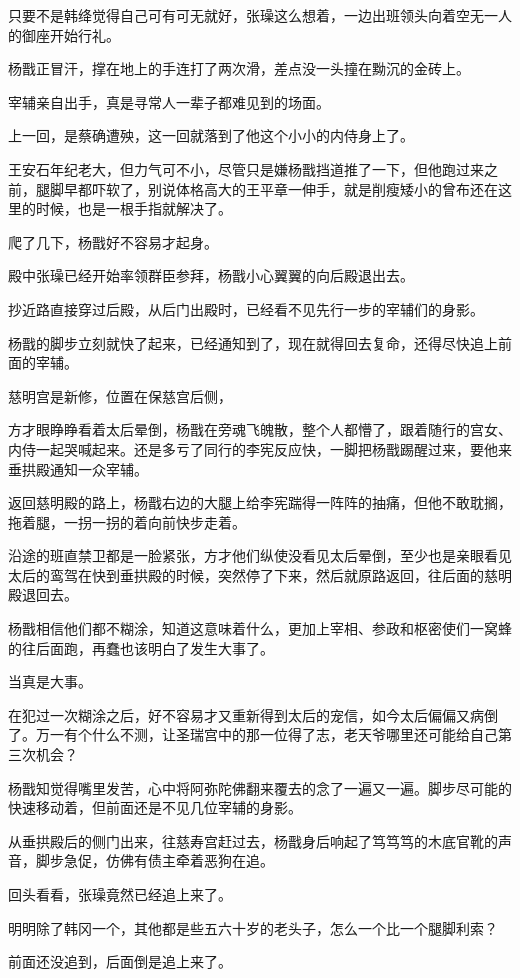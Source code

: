 只要不是韩绛觉得自己可有可无就好，张璪这么想着，一边出班领头向着空无一人的御座开始行礼。

杨戬正冒汗，撑在地上的手连打了两次滑，差点没一头撞在黝沉的金砖上。

宰辅亲自出手，真是寻常人一辈子都难见到的场面。

上一回，是蔡确遭殃，这一回就落到了他这个小小的内侍身上了。

王安石年纪老大，但力气可不小，尽管只是嫌杨戬挡道推了一下，但他跑过来之前，腿脚早都吓软了，别说体格高大的王平章一伸手，就是削瘦矮小的曾布还在这里的时候，也是一根手指就解决了。

爬了几下，杨戬好不容易才起身。

殿中张璪已经开始率领群臣参拜，杨戬小心翼翼的向后殿退出去。

抄近路直接穿过后殿，从后门出殿时，已经看不见先行一步的宰辅们的身影。

杨戬的脚步立刻就快了起来，已经通知到了，现在就得回去复命，还得尽快追上前面的宰辅。

慈明宫是新修，位置在保慈宫后侧，

方才眼睁睁看着太后晕倒，杨戬在旁魂飞魄散，整个人都懵了，跟着随行的宫女、内侍一起哭喊起来。还是多亏了同行的李宪反应快，一脚把杨戬踢醒过来，要他来垂拱殿通知一众宰辅。

返回慈明殿的路上，杨戬右边的大腿上给李宪踹得一阵阵的抽痛，但他不敢耽搁，拖着腿，一拐一拐的着向前快步走着。

沿途的班直禁卫都是一脸紧张，方才他们纵使没看见太后晕倒，至少也是亲眼看见太后的鸾驾在快到垂拱殿的时候，突然停了下来，然后就原路返回，往后面的慈明殿退回去。

杨戬相信他们都不糊涂，知道这意味着什么，更加上宰相、参政和枢密使们一窝蜂的往后面跑，再蠢也该明白了发生大事了。

当真是大事。

在犯过一次糊涂之后，好不容易才又重新得到太后的宠信，如今太后偏偏又病倒了。万一有个什么不测，让圣瑞宫中的那一位得了志，老天爷哪里还可能给自己第三次机会？

杨戬知觉得嘴里发苦，心中将阿弥陀佛翻来覆去的念了一遍又一遍。脚步尽可能的快速移动着，但前面还是不见几位宰辅的身影。

从垂拱殿后的侧门出来，往慈寿宫赶过去，杨戬身后响起了笃笃笃的木底官靴的声音，脚步急促，仿佛有债主牵着恶狗在追。

回头看看，张璪竟然已经追上来了。

明明除了韩冈一个，其他都是些五六十岁的老头子，怎么一个比一个腿脚利索？

前面还没追到，后面倒是追上来了。

